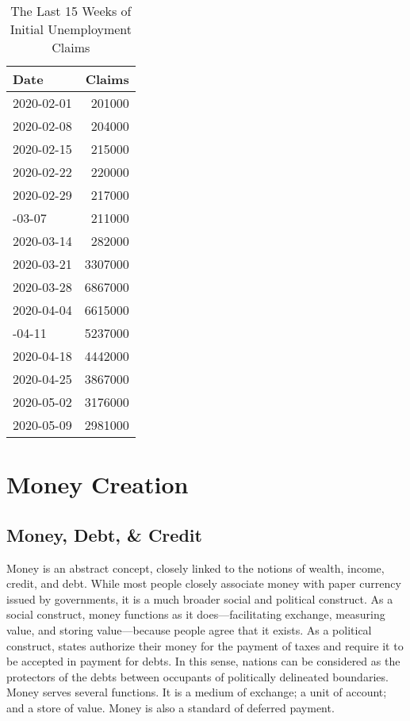 \documentclass[
]{book}
\begin{document}
\begin{table}

\caption{\label{tab:initial}The Last 15 Weeks of Initial Unemployment Claims}
\centering
\begin{tabular}[t]{lr}
\toprule
Date & Claims\\
\midrule
2020-02-01 & 201000\\
2020-02-08 & 204000\\
2020-02-15 & 215000\\
2020-02-22 & 220000\\
2020-02-29 & 217000\\
\addlinespace
2020-03-07 & 211000\\
2020-03-14 & 282000\\
2020-03-21 & 3307000\\
2020-03-28 & 6867000\\
2020-04-04 & 6615000\\
\addlinespace
2020-04-11 & 5237000\\
2020-04-18 & 4442000\\
2020-04-25 & 3867000\\
2020-05-02 & 3176000\\
2020-05-09 & 2981000\\
\bottomrule
\end{tabular}
\end{table}

\hypertarget{money}{%
\chapter{Money Creation}\label{money}}

\hypertarget{money-debt-credit}{%
\section{Money, Debt, \& Credit}\label{money-debt-credit}}

Money is an abstract concept, closely linked to the notions of wealth, income, credit, and debt. While most people closely associate money with paper currency issued by governments, it is a much broader social and political construct. As a social construct, money functions as it does---facilitating exchange, measuring value, and storing value---because people agree that it exists. As a political construct, states authorize their money for the payment of taxes and require it to be accepted in payment for debts. In this sense, nations can be considered as the protectors of the debts between occupants of politically delineated boundaries. Money serves several functions. It is a medium of exchange; a unit of account; and a store of value. Money is also a standard of deferred payment.
\end{document}
